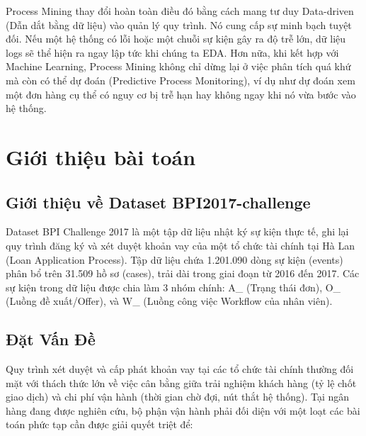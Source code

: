 \documentclass[a4paper,12pt]{article}
\begin{document}
Process Mining thay đổi hoàn toàn điều đó bằng cách mang tư duy Data-driven (Dẫn dắt bằng dữ liệu) vào quản lý quy trình. Nó cung cấp sự minh bạch tuyệt đối. Nếu một hệ thống có lỗi hoặc một chuỗi sự kiện gây ra độ trễ lớn, dữ liệu logs sẽ thể hiện ra ngay lập tức khi chúng ta EDA.
Hơn nữa, khi kết hợp với Machine Learning, Process Mining không chỉ dừng lại ở việc phân tích quá khứ mà còn có thể dự đoán (Predictive Process Monitoring), ví dụ như dự đoán xem một đơn hàng cụ thể có nguy cơ bị trễ hạn hay không ngay khi nó vừa bước vào hệ thống.

\section{Giới thiệu bài toán}

\subsection{Giới thiệu về Dataset BPI2017-challenge}
Dataset BPI Challenge 2017 là một tập dữ liệu nhật ký sự kiện thực tế, ghi lại quy trình đăng ký và xét duyệt khoản vay của một tổ chức tài chính tại Hà Lan (Loan Application Process). Tập dữ liệu chứa 1.201.090 dòng sự kiện (events) phân bổ trên 31.509 hồ sơ (cases), trải dài trong giai đoạn từ 2016 đến 2017. Các sự kiện trong dữ liệu được chia làm 3 nhóm chính: A\_ (Trạng thái đơn), O\_ (Luồng đề xuất/Offer), và W\_ (Luồng công việc Workflow của nhân viên).

\subsection{Đặt Vấn Đề}
Quy trình xét duyệt và cấp phát khoản vay tại các tổ chức tài chính thường đối mặt với thách thức lớn về việc cân bằng giữa trải nghiệm khách hàng (tỷ lệ chốt giao dịch) và chi phí vận hành (thời gian chờ đợi, nút thắt hệ thống). Tại ngân hàng đang được nghiên cứu, bộ phận vận hành phải đối diện với một loạt các bài toán phức tạp cần được giải quyết triệt để:
\end{document}
